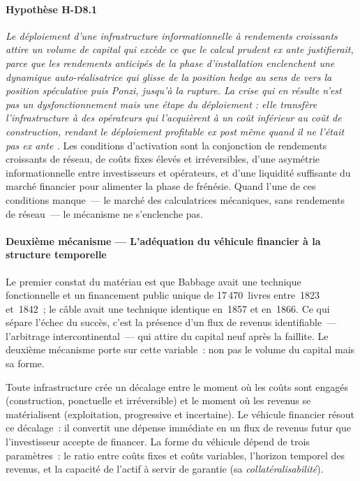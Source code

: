 \paragraph{Hypothèse H-D8.1} \emph{Le déploiement d'une infrastructure informationnelle à rendements croissants attire un volume de capital qui excède ce que le calcul prudent ex ante justifierait, parce que les rendements anticipés de la phase d'installation enclenchent une dynamique auto-réalisatrice qui glisse de la position \emph{hedge} au sens de \textcite{minsky_stabilizing_1986} vers la position spéculative puis Ponzi, jusqu'à la rupture. La crise qui en résulte n'est pas un dysfonctionnement mais une étape du déploiement : elle transfère l'infrastructure à des opérateurs qui l'acquièrent à un coût inférieur au coût de construction, rendant le déploiement profitable ex post même quand il ne l'était pas ex ante \parencite{perez_technological_2002}.} Les conditions d'activation sont la conjonction de rendements croissants de réseau, de coûts fixes élevés et irréversibles, d'une asymétrie informationnelle entre investisseurs et opérateurs, et d'une liquidité suffisante du marché financier pour alimenter la phase de frénésie. Quand l'une de ces conditions manque~--- le marché des calculatrices mécaniques, sans rendements de réseau~--- le mécanisme ne s'enclenche pas.

\paragraph{Deuxième mécanisme --- L'adéquation du véhicule financier à la structure temporelle}

Le premier constat du matériau est que Babbage avait une technique fonctionnelle et un financement public unique de 17\,470~livres entre~1823 et~1842~; le câble avait une technique identique en~1857 et en~1866. Ce qui sépare l'échec du succès, c'est la présence d'un flux de revenus identifiable~--- l'arbitrage intercontinental~--- qui attire du capital neuf après la faillite. Le deuxième mécanisme porte sur cette variable~: non pas le volume du capital mais sa forme.

Toute infrastructure crée un décalage entre le moment où les coûts sont engagés (construction, ponctuelle et irréversible) et le moment où les revenus se matérialisent (exploitation, progressive et incertaine). Le véhicule financier résout ce décalage~: il convertit une dépense immédiate en un flux de revenus futur que l'investisseur accepte de financer. La forme du véhicule dépend de trois paramètres~: le ratio entre coûts fixes et coûts variables, l'horizon temporel des revenus, et la capacité de l'actif à servir de garantie (sa \emph{collatéralisabilité}).

